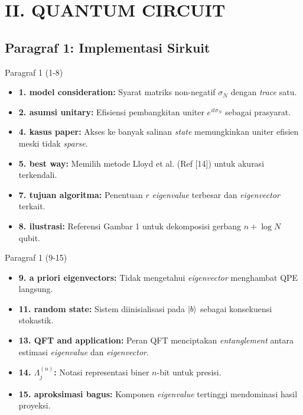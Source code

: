 \section{II. QUANTUM CIRCUIT}

\subsection{Paragraf 1: Implementasi Sirkuit}
\begin{frame}{Paragraf 1 (1-8)}
    \begin{itemize}
        \item \textbf{1. model consideration:} Syarat matriks non-negatif $\sigma_N$ dengan \textit{trace} satu.
        \item \textbf{2. asumsi unitary:} Efisiensi pembangkitan uniter $e^{it\sigma_N}$ sebagai prasyarat.
        \item \textbf{4. kasus paper:} Akses ke banyak salinan \textit{state} memungkinkan uniter efisien meski tidak \textit{sparse}.
        \item \textbf{5. best way:} Memilih metode Lloyd et al. (Ref [14]) untuk akurasi terkendali.
        \item \textbf{7. tujuan algoritma:} Penentuan $r$ \textit{eigenvalue} terbesar dan \textit{eigenvector} terkait.
        \item \textbf{8. ilustrasi:} Referensi Gambar 1 untuk dekomposisi gerbang $n + \log N$ qubit.
    \end{itemize}
\end{frame}

\begin{frame}{Paragraf 1 (9-15)}
    \begin{itemize}
        \item \textbf{9. a priori eigenvectors:} Tidak mengetahui \textit{eigenvector} menghambat QPE langsung.
        \item \textbf{11. random state:} Sistem diinisialisasi pada $\ket{b}$ sebagai konsekuensi stokastik.
        \item \textbf{13. QFT and application:} Peran QFT menciptakan \textit{entanglement} antara estimasi \textit{eigenvalue} dan \textit{eigenvector}.
        \item \textbf{14. $\Lambda_j^{(n)}$:} Notasi representasi biner $n$-bit untuk presisi.
        \item \textbf{15. aproksimasi bagus:} Komponen \textit{eigenvalue} tertinggi mendominasi hasil proyeksi.
    \end{itemize}
\end{frame}


